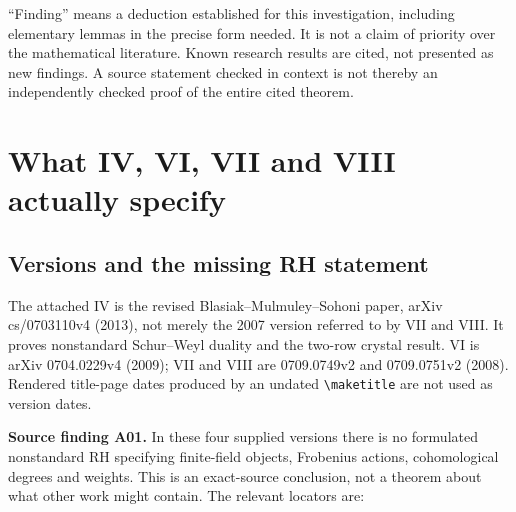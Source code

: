 \documentclass[11pt,a4paper]{article}
\theoremstyle{named}\newtheorem{finding}{Finding}[section]
\theoremstyle{definition}\newtheorem{definition}[finding]{Definition}
\theoremstyle{remark}\newtheorem{remark}[finding]{Remark}
\begin{document}
``Finding'' means a deduction established for this investigation, including elementary lemmas in the precise form needed. It is not a claim of priority over the mathematical literature. Known research results are cited, not presented as new findings. A source statement checked in context is not thereby an independently checked proof of the entire cited theorem.

\section{What IV, VI, VII and VIII actually specify}\label{sec:sources}
\subsection{Versions and the missing RH statement}
The attached IV is the revised Blasiak--Mulmuley--Sohoni paper, arXiv cs/0703110v4 (2013), not merely the 2007 version referred to by VII and VIII. It proves nonstandard Schur--Weyl duality and the two-row crystal result. VI is arXiv 0704.0229v4 (2009); VII and VIII are 0709.0749v2 and 0709.0751v2 (2008). Rendered title-page dates produced by an undated \verb|\maketitle| are not used as version dates.

\textbf{Source finding A01.} In these four supplied versions there is no formulated nonstandard RH specifying finite-field objects, Frobenius actions, cohomological degrees and weights. This is an exact-source conclusion, not a theorem about what other work might contain. The relevant locators are:
\end{document}
